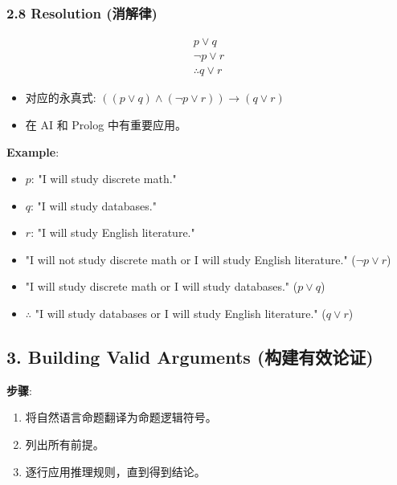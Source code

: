 \documentclass[10pt,a4paper,openany]{ctexbook}
\theoremstyle{definition}
\theoremstyle{remark}
\begin{document}
\vspace{-2pt}

\subsubsection{2.8 Resolution (消解律)}

\[
\begin{array}{c}
p \lor q \\
\neg p \lor r \\
\hline
\therefore q \lor r
\end{array}
\]

\begin{itemize}
\item 对应的永真式: $((p \lor q) \land (\neg p \lor r)) \to (q \lor r)$
\item 在 AI 和 Prolog 中有重要应用。

\end{itemize}

\textbf{Example}:
\begin{itemize}
\item $p$: "I will study discrete math."
\item $q$: "I will study databases."
\item $r$: "I will study English literature."
\item "I will not study discrete math or I will study English literature." ($\neg p \lor r$)
\item "I will study discrete math or I will study databases." ($p \lor q$)
\item $\therefore$ "I will study databases or I will study English literature." ($q \lor r$)

\end{itemize}

\vspace{-2pt}

\subsection{3. Building Valid Arguments (构建有效论证)}

\textbf{步骤}:
\begin{enumerate}
\item 将自然语言命题翻译为命题逻辑符号。
\item 列出所有前提。
\item 逐行应用推理规则，直到得到结论。

\end{enumerate}
\end{document}

